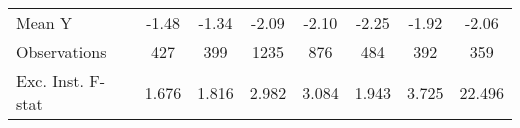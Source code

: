 {\begin{tabular}{l*{7}{c}}
\midrule
Mean Y      &       -1.48         &       -1.34         &       -2.09         &       -2.10         &       -2.25         &       -1.92         &       -2.06         \\
Observations&         427         &         399         &        1235         &         876         &         484         &         392         &         359         \\
Exc. Inst. F-stat&       1.676         &       1.816         &       2.982         &       3.084         &       1.943         &       3.725         &      22.496         \\
\bottomrule
\end{tabular}
}
